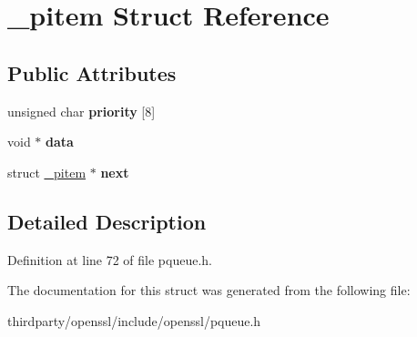\hypertarget{struct__pitem}{}\section{\+\_\+pitem Struct Reference}
\label{struct__pitem}
\subsection*{Public Attributes}
\begin{DoxyCompactItemize}
\item 
\mbox{\label{struct__pitem_af285b88224fe1db6562c5bf6208a995c}} 
unsigned char {\bfseries priority} \mbox{[}8\mbox{]}
\item 
\mbox{\label{struct__pitem_ab57fcd99b0053a93df6e10cc5adb6401}} 
void $\ast$ {\bfseries data}
\item 
\mbox{\label{struct__pitem_aabdda0dcbfb04b14c640d4a117d0061f}} 
struct \hyperlink{struct__pitem}{\+\_\+pitem} $\ast$ {\bfseries next}
\end{DoxyCompactItemize}


\subsection{Detailed Description}


Definition at line 72 of file pqueue.\+h.



The documentation for this struct was generated from the following file\+:\begin{DoxyCompactItemize}
\item 
thirdparty/openssl/include/openssl/pqueue.\+h\end{DoxyCompactItemize}
